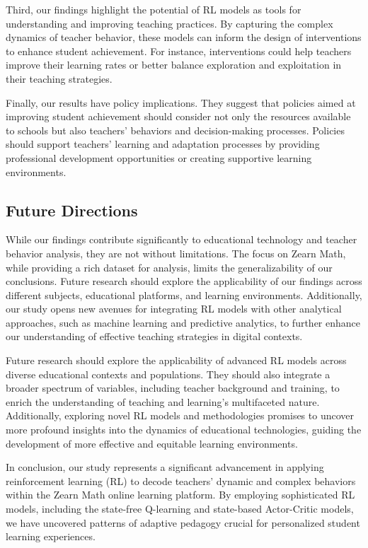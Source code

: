 \documentclass[
  number,
  preprint,
  3p,
  onecolumn]{elsarticle}
\begin{document}
Third, our findings highlight the potential of RL models as tools for
understanding and improving teaching practices. By capturing the complex
dynamics of teacher behavior, these models can inform the design of
interventions to enhance student achievement. For instance,
interventions could help teachers improve their learning rates or better
balance exploration and exploitation in their teaching strategies.

Finally, our results have policy implications. They suggest that
policies aimed at improving student achievement should consider not only
the resources available to schools but also teachers' behaviors and
decision-making processes. Policies should support teachers' learning
and adaptation processes by providing professional development
opportunities or creating supportive learning environments.

\subsection{Future Directions}\label{future-directions}

While our findings contribute significantly to educational technology
and teacher behavior analysis, they are not without limitations. The
focus on Zearn Math, while providing a rich dataset for analysis, limits
the generalizability of our conclusions. Future research should explore
the applicability of our findings across different subjects, educational
platforms, and learning environments. Additionally, our study opens new
avenues for integrating RL models with other analytical approaches, such
as machine learning and predictive analytics, to further enhance our
understanding of effective teaching strategies in digital contexts.

Future research should explore the applicability of advanced RL models
across diverse educational contexts and populations. They should also
integrate a broader spectrum of variables, including teacher background
and training, to enrich the understanding of teaching and learning's
multifaceted nature. Additionally, exploring novel RL models and
methodologies promises to uncover more profound insights into the
dynamics of educational technologies, guiding the development of more
effective and equitable learning environments.

In conclusion, our study represents a significant advancement in
applying reinforcement learning (RL) to decode teachers' dynamic and
complex behaviors within the Zearn Math online learning platform. By
employing sophisticated RL models, including the state-free Q-learning
and state-based Actor-Critic models, we have uncovered patterns of
adaptive pedagogy crucial for personalized student learning experiences.
\end{document}
